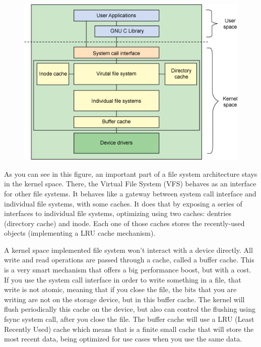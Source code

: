         \begin{figure}[h]
           \begin{center}
               \includegraphics[width=15cm]{theoretical/filesystem-arhitecture.png}
            \end{center}
        \end{figure}

        As you can see in this figure, an important part of a file system architecture stays in the kernel space. There, the Virtual File System (VFS) behaves as an interface for other file systems. It behaves like a gateway between system call interface and individual file systems, with some caches. It does that by exposing a series of interfaces to individual file systems, optimizing using two caches: dentries (directory cache) and inode. Each one of those caches stores the recently-used objects (implementing a LRU cache mechanism).
        
        A kernel space implemented file system won't interact with a device directly. All write and read operations are passed through a cache, called a buffer cache. This is a very smart mechanism that offers a big performance boost, but with a cost. If you use the system call interface in order to write something in a file, that write is not atomic, meaning that if you close the file, the bits that you are writing are not on the storage device, but in this buffer cache. The kernel will flush periodically this cache on the device, but also can control the flushing using fsync system call, after you close the file. The buffer cache will use a LRU (Least Recently Used) cache which means that is a finite small cache that will store the most recent data, being optimized for use cases when you use the same data. 
        
